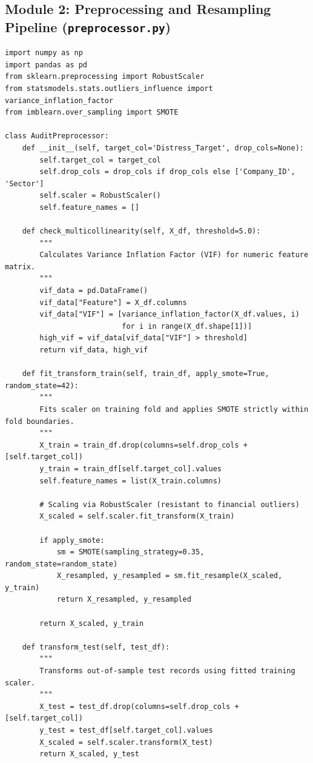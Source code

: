 \documentclass[11pt, a4paper]{article}
\begin{document}
\subsection{Module 2: Preprocessing and Resampling Pipeline (\texttt{preprocessor.py})}
\begin{verbatim}
import numpy as np
import pandas as pd
from sklearn.preprocessing import RobustScaler
from statsmodels.stats.outliers_influence import variance_inflation_factor
from imblearn.over_sampling import SMOTE

class AuditPreprocessor:
    def __init__(self, target_col='Distress_Target', drop_cols=None):
        self.target_col = target_col
        self.drop_cols = drop_cols if drop_cols else ['Company_ID', 'Sector']
        self.scaler = RobustScaler()
        self.feature_names = []
        
    def check_multicollinearity(self, X_df, threshold=5.0):
        """
        Calculates Variance Inflation Factor (VIF) for numeric feature matrix.
        """
        vif_data = pd.DataFrame()
        vif_data["Feature"] = X_df.columns
        vif_data["VIF"] = [variance_inflation_factor(X_df.values, i)
                           for i in range(X_df.shape[1])]
        high_vif = vif_data[vif_data["VIF"] > threshold]
        return vif_data, high_vif
        
    def fit_transform_train(self, train_df, apply_smote=True, random_state=42):
        """
        Fits scaler on training fold and applies SMOTE strictly within fold boundaries.
        """
        X_train = train_df.drop(columns=self.drop_cols + [self.target_col])
        y_train = train_df[self.target_col].values
        self.feature_names = list(X_train.columns)
        
        # Scaling via RobustScaler (resistant to financial outliers)
        X_scaled = self.scaler.fit_transform(X_train)
        
        if apply_smote:
            sm = SMOTE(sampling_strategy=0.35, random_state=random_state)
            X_resampled, y_resampled = sm.fit_resample(X_scaled, y_train)
            return X_resampled, y_resampled
            
        return X_scaled, y_train
        
    def transform_test(self, test_df):
        """
        Transforms out-of-sample test records using fitted training scaler.
        """
        X_test = test_df.drop(columns=self.drop_cols + [self.target_col])
        y_test = test_df[self.target_col].values
        X_scaled = self.scaler.transform(X_test)
        return X_scaled, y_test
\end{verbatim}
\end{document}
